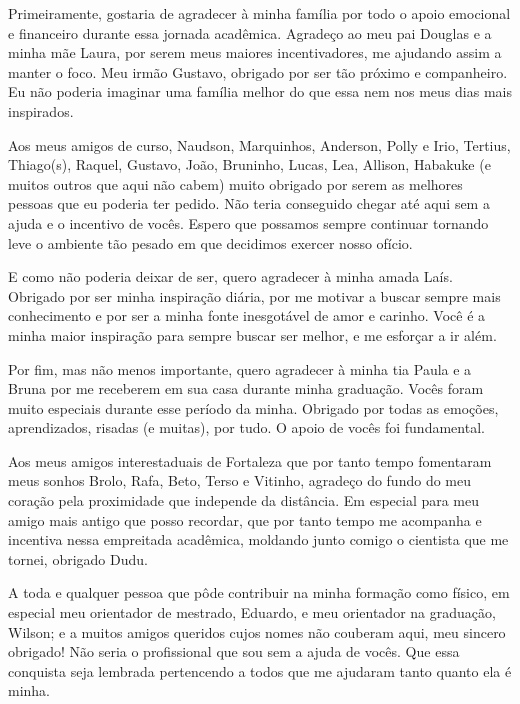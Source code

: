 \begin{agradecimentos}
Primeiramente, gostaria de agradecer à minha família por todo o apoio emocional e financeiro durante essa jornada acadêmica. Agradeço ao meu pai Douglas e a minha mãe Laura, por serem meus maiores incentivadores, me ajudando assim a manter o foco. Meu irmão Gustavo, obrigado por ser tão próximo e companheiro. Eu não poderia imaginar uma família melhor do que essa nem nos meus dias mais inspirados.

Aos meus amigos de curso, Naudson, Marquinhos, Anderson, Polly e Irio, Tertius, Thiago(s), Raquel, Gustavo, João, Bruninho, Lucas, Lea, Allison, Habakuke (e muitos outros que aqui não cabem) muito obrigado por serem as melhores pessoas que eu poderia ter pedido. Não teria conseguido chegar até aqui sem a ajuda e o incentivo de vocês. Espero que possamos sempre continuar tornando leve o ambiente tão pesado em que decidimos exercer nosso ofício.

E como não poderia deixar de ser, quero agradecer à minha amada Laís. Obrigado por ser minha inspiração diária, por me motivar a buscar sempre mais conhecimento e por ser a minha fonte inesgotável de amor e carinho. Você é a minha maior inspiração para sempre buscar ser melhor, e me esforçar a ir além.

Por fim, mas não menos importante, quero agradecer à minha tia Paula e a Bruna por me receberem em sua casa durante minha graduação. Vocês foram muito especiais durante esse período da minha. Obrigado por todas as emoções, aprendizados, risadas (e muitas), por tudo. O apoio de vocês foi fundamental.


Aos meus amigos interestaduais de Fortaleza que por tanto tempo fomentaram meus sonhos Brolo, Rafa, Beto, Terso e Vitinho, agradeço do fundo do meu coração pela proximidade que independe da distância. Em especial para meu amigo mais antigo que posso recordar, que por tanto tempo me acompanha e incentiva nessa empreitada acadêmica, moldando junto comigo o cientista que me tornei, obrigado Dudu.


A toda e qualquer pessoa que pôde contribuir na minha formação como físico, em especial meu orientador de mestrado, Eduardo, e meu orientador na graduação, Wilson; e a muitos amigos queridos cujos nomes não couberam aqui, meu sincero obrigado! Não seria o profissional que sou sem a ajuda de vocês. Que essa conquista seja lembrada pertencendo a todos que me ajudaram tanto quanto ela é minha.


\end{agradecimentos}
